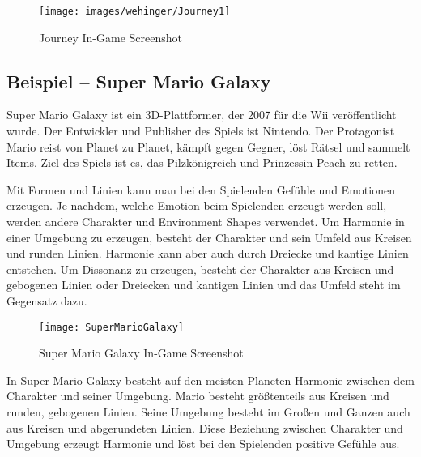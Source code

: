 \begin{figure}[H]
	\centering
	\texttt{[image: images/wehinger/Journey1]}
	\caption{Journey In-Game Screenshot \cite{_journey}}
\end{figure}

\subsection{Beispiel – Super Mario Galaxy}
Super Mario Galaxy ist ein 3D-Plattformer, der 2007 für die Wii veröffentlicht wurde. Der Entwickler und Publisher des Spiels ist Nintendo. Der Protagonist Mario reist von Planet zu Planet, kämpft gegen Gegner, löst Rätsel und sammelt Items. Ziel des Spiels ist es, das Pilzkönigreich und Prinzessin Peach zu retten. 
\cite{_super_mario_galaxy}
\cite{_drawing_basics_and_video_game_art}

Mit Formen und Linien kann man bei den Spielenden Gefühle und Emotionen erzeugen. Je nachdem, welche Emotion beim Spielenden erzeugt werden soll, werden andere Charakter und Environment Shapes verwendet. Um Harmonie in einer Umgebung zu erzeugen, besteht der Charakter und sein Umfeld aus Kreisen und runden Linien. Harmonie kann aber auch durch Dreiecke und kantige Linien entstehen. Um Dissonanz zu erzeugen, besteht der Charakter aus Kreisen und gebogenen Linien oder Dreiecken und kantigen Linien und das Umfeld steht im Gegensatz dazu.
\cite{_drawing_basics_and_video_game_art}

\begin{figure}[H]
	\centering
	\texttt{[image: SuperMarioGalaxy]}
	\caption{Super Mario Galaxy In-Game Screenshot\cite{_drawing_basics_and_video_game_art}}
\end{figure}

In Super Mario Galaxy besteht auf den meisten Planeten Harmonie zwischen dem Charakter und seiner Umgebung. Mario besteht größtenteils aus Kreisen und runden, gebogenen Linien. Seine Umgebung besteht im Großen und Ganzen auch aus Kreisen und abgerundeten Linien. Diese Beziehung zwischen Charakter und Umgebung erzeugt Harmonie und löst bei den Spielenden positive Gefühle aus. 
\cite{_drawing_basics_and_video_game_art}




